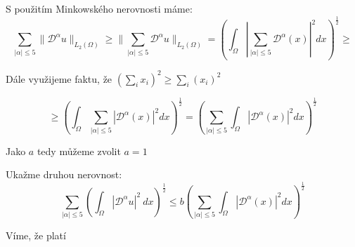 \documentclass[../main.tex]{subfiles}
\begin{document}
S použitím Minkowského nerovnosti máme:
\begin{equation}
    \sum_{|\alpha| \leq 5} \| \mathcal{D}^\alpha u \|_{L_2(\Omega)}  \geq  \| \sum_{|\alpha| \leq 5} \mathcal{D}^\alpha u \|_{L_2(\Omega)} =  \left(  \int_\Omega \left| \sum_{|\alpha| \leq 5} \mathcal{D}^\alpha(x)\right|^2 dx\right)^\frac{1}{2} \geq
\end{equation}

Dále využijeme faktu, že $ \left(\sum_i x_i\right)^2 \geq \sum_i \left( x_i\right)^2$

\begin{equation}
    \geq \left(  \int_\Omega  \sum_{|\alpha| \leq 5} \left|\mathcal{D}^\alpha(x)\right|^2 dx\right)^\frac{1}{2} = \left(  \sum_{|\alpha| \leq 5}\int_\Omega \left|  \mathcal{D}^\alpha(x)\right|^2 dx\right)^\frac{1}{2}
\end{equation}

Jako $a$ tedy můžeme zvolit $a=1$















Ukažme druhou nerovnost: 
\begin{equation*}
    \sum_{|\alpha| \leq 5} \left( \int_\Omega| \mathcal{D}^\alpha u |^2 \ dx  \right)^\frac{1}{2} \leq b \left( \sum_{|\alpha| \leq 5} \int_\Omega | \mathcal{D}^\alpha(x)|^2 dx\right)^\frac{1}{2}
\end{equation*} 

Víme, že platí 
\end{document}
